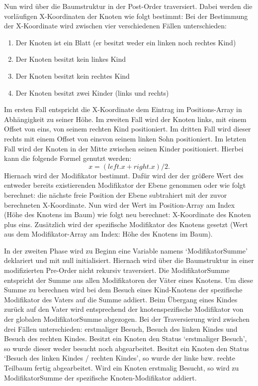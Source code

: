 Nun wird über die Baumstruktur in der Post-Order traversiert. Dabei werden die vorläufigen X-Koordinaten der Knoten wie folgt bestimmt:
Bei der Bestimmung der X-Koordinate wird zwischen vier verschiedenen Fällen unterschieden:
\begin{enumerate}
	\item Der Knoten ist ein Blatt (er besitzt weder ein linken noch rechtes Kind)
	\item Der Knoten besitzt kein linkes Kind
	\item Der Knoten besitzt kein rechtes Kind
	\item Der Knoten besitzt zwei Kinder (links und rechts)
\end{enumerate}

Im ersten Fall entspricht die X-Koordinate dem Eintrag im Positions-Array in Abhängigkeit zu seiner Höhe.
Im zweiten Fall wird der Knoten links, mit einem Offset von eins, von seinem rechten Kind positioniert.
Im dritten Fall wird dieser rechts mit einem Offset von einsvon seinem linken Sohn positioniert. Im letzten Fall wird der Knoten
in der Mitte zwischen seinen Kinder positioniert. Hierbei kann die folgende Formel genutzt werden: $$x = (left.x + right.x) / 2.$$
Hiernach wird der Modifikator bestimmt. Dafür wird der der größere Wert des entweder bereits existierenden Modifikator der Ebene genommen
oder wie folgt berechnet: die nächste freie Position der Ebene subtrahiert mit der zuvor berechneten X-Koordinate.
Nun wird der Wert im Position-Array am Index (Höhe des Knotens im Baum) wie folgt neu berechnet:
X-Koordinate des Knoten plus eins. Zusätzlich wird der spezifische Modifikator des Knotens gesetzt
(Wert aus dem Modifikator-Array am Index: Höhe des Knotens im Baum).

In der zweiten Phase wird zu Beginn eine Variable namens ‘ModifikatorSumme’ deklariert und mit null initialisiert.
Hiernach wird über die Baumstruktur in einer modifizierten Pre-Order nicht rekursiv traversiert. Die ModifikatorSumme entspricht
der Summe aus allen Modifikatoren der Väter eines Knotens. Um diese Summe zu berechnen wird bei dem Besuch eines Kind-Knotens
der spezifische Modifikator des Vaters auf die Summe addiert. Beim Übergang eines Kindes zurück auf den Vater wird entsprechend
der knotenspezifische Modifikator von der globalen ModifikatorSumme abgezogen. Bei der Traversierung wird zwischen
drei Fällen unterschieden: erstmaliger Besuch, Besuch des linken Kindes und Besuch des rechten Kindes. Besitzt ein Knoten den Status
‘erstmaliger Besuch’, so wurde dieser weder besucht noch abgearbeitet. Besitzt ein Knoten den Status ‘Besuch des linken Kindes / rechten Kindes’,
so wurde der linke bzw. rechte Teilbaum fertig abgearbeitet.
Wird ein Knoten erstmalig Besucht, so wird zu ModifikatorSumme der spezifische Knoten-Modifikator addiert. 

